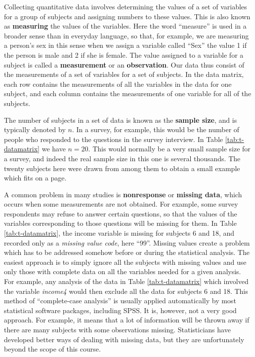 \documentclass[11pt,a4paper,openany]{book}
\begin{document}
Collecting quantitative data involves determining the values of a set of
variables for a group of subjects and assigning numbers to these values.
This is also known as \textbf{measuring} the values of the variables.
Here the word ``measure'' is used in a broader sense than in everyday
language, so that, for example, we are measuring a person's sex in this
sense when we assign a variable called ``Sex'' the value 1 if the person
is male and 2 if she is female. The value assigned to a variable for a
subject is called a \textbf{measurement} or an \textbf{observation}. Our
data thus consist of the measurements of a set of variables for a set of
subjects. In the data matrix, each row contains the measurements of all
the variables in the data for one subject, and each column contains the
measurements of one variable for all of the subjects.

The number of subjects in a set of data is known as the \textbf{sample
size}, and is typically denoted by \(n\). In a survey, for example, this
would be the number of people who responded to the questions in the
survey interview. In Table \ref{tab:t-datamatrix} we have \(n=20\). This
would normally be a very small sample size for a survey, and indeed the
real sample size in this one is several thousands. The twenty subjects
here were drawn from among them to obtain a small example which fits on
a page.

A common problem in many studies is \textbf{nonresponse} or
\textbf{missing data}, which occurs when some measurements are not
obtained. For example, some survey respondents may refuse to answer
certain questions, so that the values of the variables corresponding to
those questions will be missing for them. In Table
\ref{tab:t-datamatrix}, the income variable is missing for subjects 6
and 18, and recorded only as a \emph{missing value code}, here ``99''.
Missing values create a problem which has to be addressed somehow before
or during the statistical analysis. The easiest approach is to simply
ignore all the subjects with missing values and use only those with
complete data on all the variables needed for a given analysis. For
example, any analysis of the data in Table \ref{tab:t-datamatrix} which
involved the variable \emph{income4} would then exclude all the data for
subjects 6 and 18. This method of ``complete-case analysis'' is usually
applied automatically by most statistical software packages, including
SPSS. It is, however, not a very good approach. For example, it means
that a lot of information will be thrown away if there are many subjects
with some observations missing. Statisticians have developed better ways
of dealing with missing data, but they are unfortunately beyond the
scope of this course.
\end{document}
